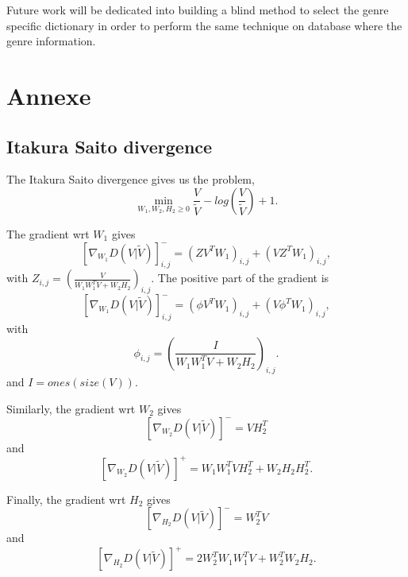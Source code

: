 \documentclass{article}
\begin{document}
Future work will be dedicated into building a blind method to select the genre specific dictionary in order to perform the same technique on database where the genre information. 



\section{Annexe}
 
\subsection{Itakura Saito divergence}\label{ISdisteq}
The Itakura Saito divergence gives us the problem,
$$\min_{W_1,W_2,H_2 \geq 0} \frac{V}{\tilde{V}} - log(\frac{V}{\tilde{V}}) +1.$$

The gradient wrt $W_1$ gives
$$[\nabla_{W_1} D(V|\tilde{V})]_{i,j}^{-} = (ZV^TW_1)_{i,j} + (VZ^TW_1)_{i,j},$$
with $Z_{i,j} = (\frac{V}{W_1W_1^TV + W_2H_2})_{i,j}$. 
The positive part of the gradient is
$$[\nabla_{W_1} D(V|\tilde{V})]_{i,j}^{-} = (\phi V^TW_1)_{i,j} + (V \phi^T W_1)_{i,j},$$
with $$ \phi_{i,j} = (\frac{I}{W_1W_1^TV + W_2H_2})_{i,j}.$$ and $I = ones(size(V))$.


Similarly, the gradient wrt $W_2$ gives
$$ [\nabla_{W_2} D(V|\tilde{V})]^{-} = VH_2^T $$
and
$$ [\nabla_{W_2} D(V|\tilde{V})]^{+} = W_1W_1^TVH_2^T + W_2H_2H_2^T.$$

Finally, the gradient wrt $H_2$ gives
$$ [\nabla_{H_2} D(V|\tilde{V})]^{-} = W_2^TV  $$
and
$$ [\nabla_{H_2} D(V|\tilde{V})]^{+} = 2W_2^TW_1W_1^TV + W_2^TW_2H_2. $$






%
%
%
%
\end{document}
